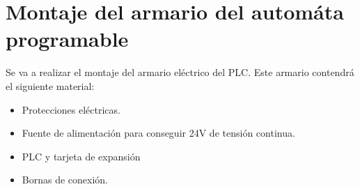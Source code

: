 \chapter{Montaje del armario del automáta programable}
\label{ane:plc}
Se va a realizar el montaje del armario eléctrico del PLC. Este armario contendrá el siguiente material:

    \begin{itemize}
        \item{Protecciones eléctricas.}
        \item{Fuente de alimentación para conseguir 24V de tensión continua.}
        \item{PLC y tarjeta de expansión}
        \item{Bornas de conexión.}
    \end{itemize}

